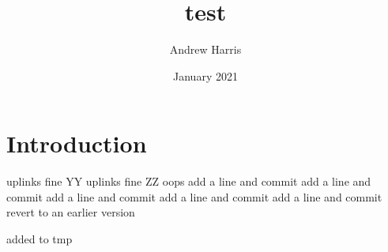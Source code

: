 \documentclass{article}
\title{test}
\author{Andrew Harris}
\date{January 2021}
\begin{document}
\maketitle

\section{Introduction}
uplinks fine YY
uplinks fine ZZ
oops
add a line and commit
add a line and commit
add a line and commit
add a line and commit
add a line and commit
revert to an earlier version

added to tmp
\end{document}

